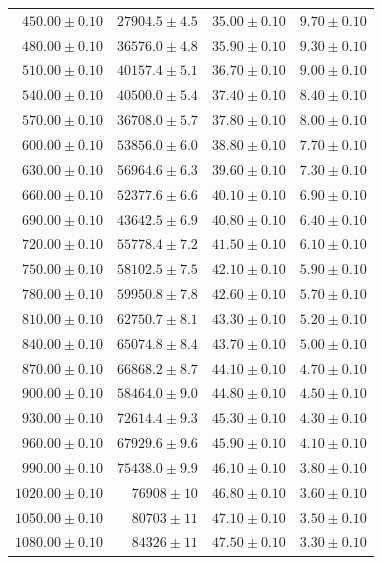 \documentclass[a4paper,11pt]{article}
\begin{document}
\begin{longtable}{r r r r}
  $450.00 \pm 0.10$ & $27904.5 \pm 4.5$ & $35.00 \pm 0.10$ & $9.70 \pm 0.10$ \\
  $480.00 \pm 0.10$ & $36576.0 \pm 4.8$ & $35.90 \pm 0.10$ & $9.30 \pm 0.10$ \\
  $510.00 \pm 0.10$ & $40157.4 \pm 5.1$ & $36.70 \pm 0.10$ & $9.00 \pm 0.10$ \\
  $540.00 \pm 0.10$ & $40500.0 \pm 5.4$ & $37.40 \pm 0.10$ & $8.40 \pm 0.10$ \\
  $570.00 \pm 0.10$ & $36708.0 \pm 5.7$ & $37.80 \pm 0.10$ & $8.00 \pm 0.10$ \\
  $600.00 \pm 0.10$ & $53856.0 \pm 6.0$ & $38.80 \pm 0.10$ & $7.70 \pm 0.10$ \\
  $630.00 \pm 0.10$ & $56964.6 \pm 6.3$ & $39.60 \pm 0.10$ & $7.30 \pm 0.10$ \\
  $660.00 \pm 0.10$ & $52377.6 \pm 6.6$ & $40.10 \pm 0.10$ & $6.90 \pm 0.10$ \\
  $690.00 \pm 0.10$ & $43642.5 \pm 6.9$ & $40.80 \pm 0.10$ & $6.40 \pm 0.10$ \\
  $720.00 \pm 0.10$ & $55778.4 \pm 7.2$ & $41.50 \pm 0.10$ & $6.10 \pm 0.10$ \\
  $750.00 \pm 0.10$ & $58102.5 \pm 7.5$ & $42.10 \pm 0.10$ & $5.90 \pm 0.10$ \\
  $780.00 \pm 0.10$ & $59950.8 \pm 7.8$ & $42.60 \pm 0.10$ & $5.70 \pm 0.10$ \\
  $810.00 \pm 0.10$ & $62750.7 \pm 8.1$ & $43.30 \pm 0.10$ & $5.20 \pm 0.10$ \\
  $840.00 \pm 0.10$ & $65074.8 \pm 8.4$ & $43.70 \pm 0.10$ & $5.00 \pm 0.10$ \\
  $870.00 \pm 0.10$ & $66868.2 \pm 8.7$ & $44.10 \pm 0.10$ & $4.70 \pm 0.10$ \\
  $900.00 \pm 0.10$ & $58464.0 \pm 9.0$ & $44.80 \pm 0.10$ & $4.50 \pm 0.10$ \\
  $930.00 \pm 0.10$ & $72614.4 \pm 9.3$ & $45.30 \pm 0.10$ & $4.30 \pm 0.10$ \\
  $960.00 \pm 0.10$ & $67929.6 \pm 9.6$ & $45.90 \pm 0.10$ & $4.10 \pm 0.10$ \\
  $990.00 \pm 0.10$ & $75438.0 \pm 9.9$ & $46.10 \pm 0.10$ & $3.80 \pm 0.10$ \\
  $1020.00 \pm 0.10$ & $76908 \pm 10$ & $46.80 \pm 0.10$ & $3.60 \pm 0.10$ \\
  $1050.00 \pm 0.10$ & $80703 \pm 11$ & $47.10 \pm 0.10$ & $3.50 \pm 0.10$ \\
  $1080.00 \pm 0.10$ & $84326 \pm 11$ & $47.50 \pm 0.10$ & $3.30 \pm 0.10$ \\

\end{longtable}
\end{document}
